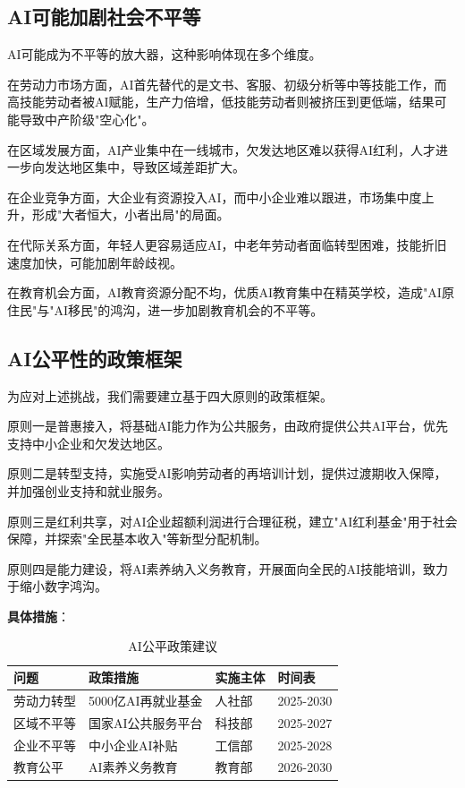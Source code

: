 \subsection{AI可能加剧社会不平等}

AI可能成为不平等的放大器，这种影响体现在多个维度。

在劳动力市场方面，AI首先替代的是文书、客服、初级分析等中等技能工作，而高技能劳动者被AI赋能，生产力倍增，低技能劳动者则被挤压到更低端，结果可能导致中产阶级"空心化"。

在区域发展方面，AI产业集中在一线城市，欠发达地区难以获得AI红利，人才进一步向发达地区集中，导致区域差距扩大。

在企业竞争方面，大企业有资源投入AI，而中小企业难以跟进，市场集中度上升，形成"大者恒大，小者出局"的局面。

在代际关系方面，年轻人更容易适应AI，中老年劳动者面临转型困难，技能折旧速度加快，可能加剧年龄歧视。

在教育机会方面，AI教育资源分配不均，优质AI教育集中在精英学校，造成"AI原住民"与"AI移民"的鸿沟，进一步加剧教育机会的不平等。

\subsection{AI公平性的政策框架}

为应对上述挑战，我们需要建立基于四大原则的政策框架。

原则一是普惠接入，将基础AI能力作为公共服务，由政府提供公共AI平台，优先支持中小企业和欠发达地区。

原则二是转型支持，实施受AI影响劳动者的再培训计划，提供过渡期收入保障，并加强创业支持和就业服务。

原则三是红利共享，对AI企业超额利润进行合理征税，建立"AI红利基金"用于社会保障，并探索"全民基本收入"等新型分配机制。

原则四是能力建设，将AI素养纳入义务教育，开展面向全民的AI技能培训，致力于缩小数字鸿沟。

\textbf{具体措施}：

\begin{table}[H]
\centering
\caption{AI公平政策建议}
\small
\begin{tabular}{p{2.5cm}p{4cm}p{4cm}p{2cm}}
\toprule
\textbf{问题} & \textbf{政策措施} & \textbf{实施主体} & \textbf{时间表} \\
\midrule
劳动力转型 & 5000亿AI再就业基金 & 人社部 & 2025-2030 \\
区域不平等 & 国家AI公共服务平台 & 科技部 & 2025-2027 \\
企业不平等 & 中小企业AI补贴 & 工信部 & 2025-2028 \\
教育公平 & AI素养义务教育 & 教育部 & 2026-2030 \\
\bottomrule
\end{tabular}
\end{table}


